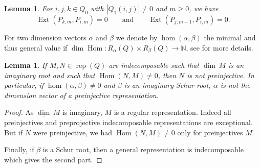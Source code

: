 \documentclass{amsart}
\newtheorem{lemma}[theorem]{Lemma}
\numberwithin{equation}{section}
\newcommand{\NN}{\mathbb{N}}
\newcommand\udim{{\underline{\dim}\, }}
\newcommand{\Ext}{\operatorname{Ext}}
\newcommand{\Hom}{\operatorname{Hom}}
\newcommand{\rep}{\operatorname{rep}}
\begin{document}
\begin{lemma}
  \label{le:preprojective ext groups}
  For $i,j,k\in Q_0$ with $|Q_1(i,j)|\ne0$ and $m\ge0$, we have 
  \[\Ext(P_{k,m},P_{i,m})=0 \qquad \text{and} \qquad \Ext(P_{j,m+1},P_{i,m})=0.\]
\end{lemma}
For two dimension vectors $\alpha$ and $\beta$ we denote by $\hom(\alpha,\beta)$ the minimal and thus general value if $\dim\Hom:R_\alpha(Q)\times R_\beta(Q)\to \NN$, see \cite{sch} for more details.
\begin{lemma}
  \label{lem: non-preinjective}
  If $M,N\in\rep(Q)$ are indecomposable such that $\udim M$ is an imaginary root and such that $\Hom(N,M)\neq 0$, then $N$ is not preinjective.
  In particular, if $\hom(\alpha,\beta)\neq 0$ and $\beta$ is an imaginary Schur root, $\alpha$ is not the dimension vector of a preinjective representation.
\end{lemma}
\begin{proof}
  As $\udim M$ is imaginary, $M$ is a regular representation.
  Indeed all preinjectives and preprojective indecomposable representations are exceptional.
  But if $N$ were preinjective, we had $\Hom(N,M)\neq 0$ only for preinjectives $M$.

  Finally, if $\beta$ is a Schur root, then a general representation is indecomposable which gives the second part.
\end{proof}
\end{document}
